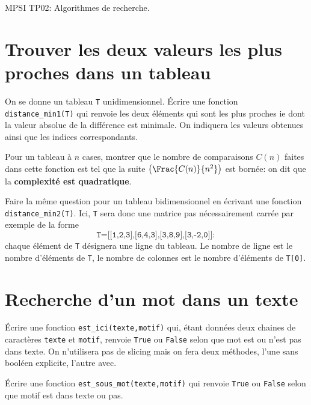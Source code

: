 

\large MPSI \hfill TP02: Algorithmes de recherche.

\newcommand{\indente}{\hspace*{1cm}}

\smallskip
\hline

\bigskip



\vskip1cm

\section{Trouver les deux valeurs les plus proches dans un tableau}


\be \q On se donne un tableau \texttt{T} unidimensionnel. \'Ecrire une fonction \texttt{distance\_min1(T)} qui renvoie les deux éléments qui sont les plus proches ie dont la valeur absolue de la différence est minimale. On indiquera les valeurs obtenues ainsi que les indices correspondants.

\q Pour un tableau à $n$ cases, montrer que le nombre de comparaisons $C(n)$ faites dans cette fonction est tel que la suite $\left(\Frac{C(n)}{n^2}\right)$ est bornée: on dit que la  \textbf{complexité est quadratique}.

\q Faire la même question pour un tableau bidimensionnel en écrivant une fonction \texttt{distance\_min2(T)}. Ici, \texttt{T} sera donc une matrice pas nécessairement carrée par exemple de la forme $$\texttt{T=[[1,2,3],[6,4,3],[3,8,9],[3,-2,0]]}:$$ chaque élément de \texttt{T} désignera une ligne du tableau. Le nombre de ligne est le nombre d'éléments de \texttt{T}, le nombre de colonnes est le nombre d'éléments de \texttt{T[0]}.


\ee

\section{Recherche d'un mot dans un texte}

\be\q \'Ecrire une fonction \texttt{est\_ici(texte,motif)} qui, étant données deux chaines de caractères \texttt{texte}  et \texttt{motif}, renvoie \texttt{True} ou \texttt{False} selon que mot est ou n'est pas dans texte. On n'utilisera pas de slicing mais on fera deux méthodes, l'une sans booléen explicite, l'autre avec.

\q \'Ecrire une fonction \texttt{est\_sous\_mot(texte,motif)} qui renvoie \texttt{True} ou \texttt{False} selon que motif est dans texte ou pas.

